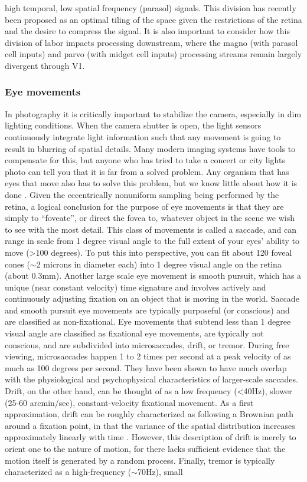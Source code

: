high temporal, low spatial frequency (parasol) signals. This division has recently been proposed as an optimal tiling of the space given the restrictions of the retina \parencite{mcintosh2016deep} and the desire to compress the signal. It is also important to consider how this division of labor impacts processing downstream, where the magno (with parasol cell inputs) and parvo (with midget cell inputs) processing streams remain largely divergent through V1.

\subsubsection{Eye movements}
In photography it is critically important to stabilize the camera, especially in dim lighting conditions. When the camera shutter is open, the light sensors continuously integrate light information such that any movement is going to result in blurring of spatial details. Many modern imaging systems have tools to compensate for this, but anyone who has tried to take a concert or city lights photo can tell you that it is far from a solved problem. Any organism that has eyes that move also has to solve this problem, but we know little about how it is done \parencite{olshausen2010does, burak2010bayesian}. Given the eccentrically nonuniform sampling being performed by the retina, a logical conclusion for the purpose of eye movements is that they are simply to ``foveate'', or direct the fovea to, whatever object in the scene we wish to see with the most detail. This class of movements is called a saccade, and can range in scale from 1 degree visual angle to the full extent of your eyes’ ability to move (\textgreater 100 degrees). To put this into perspective, you can fit about 120 foveal cones ($\sim$2 microns in diameter each) into 1 degree visual angle on the retina (about 0.3mm). Another large scale eye movement is smooth pursuit, which has a unique (near constant velocity) time signature and involves actively and continuously adjusting fixation on an object that is moving in the world. Saccade and smooth pursuit eye movements are typically purposeful (or conscious) and are classified as non-fixational. Eye movements that subtend less than 1 degree visual angle are classified as fixational eye movements, are typically not conscious, and are subdivided into microsaccades, drift, or tremor. During free viewing, microsaccades happen 1 to 2  times per second at a peak velocity of as much as 100 degrees per second. They have been shown to have much overlap with the physiological and psychophysical characteristics of larger-scale saccades. Drift, on the other hand, can be thought of as a low frequency (\textless 40Hz), slower (25-60 arcmin/sec), constant-velocity fixational movement. As a first approximation, drift can be roughly characterized as following a Brownian path around a fixation point, in that the variance of the spatial distribution increases approximately linearly with time \parencite{rucci2015unsteady}. However, this description of drift is merely to orient one to the nature of motion, for there lacks sufficient evidence that the motion itself is generated by a random process. Finally, tremor is typically characterized as a high-frequency ($\sim$70Hz), small 